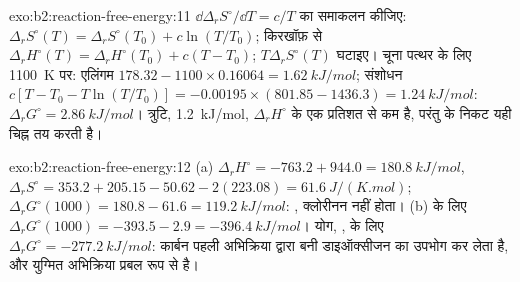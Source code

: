 \begin{solution}{exo:b2:reaction-free-energy:11}
$\dd\Delta_r S^\circ/\dd T = c/T$ का समाकलन कीजिए: $\Delta_r S^\circ(T) = \Delta_r
S^\circ(T_0) + c\ln(T/T_0)$; किरखॉफ़ से $\Delta_r H^\circ(T) = \Delta_r
H^\circ(T_0) + c(T - T_0)$; $T\Delta_r S^\circ(T)$ घटाइए। चूना पत्थर के लिए
\qty{1100}{K} पर: एलिंगम $178.32 - 1100 \times 0.16064 = \qty{1.62}{kJ/mol}$;
संशोधन $c[T - T_0 - T\ln(T/T_0)] = -0.00195 \times (801.85 - 1436.3) =
\qty{+1.24}{kJ/mol}$: $\Delta_r G^\circ = \qty{2.86}{kJ/mol}$। त्रुटि,
\qty{1.2}{kJ/mol}, $\Delta_r H^\circ$ के एक प्रतिशत से कम है, परंतु
 के निकट यही चिह्न तय करती है।
\end{solution}

\begin{solution}{exo:b2:reaction-free-energy:12}
(a) $\Delta_r H^\circ = -763.2 + 944.0 = \qty{+180.8}{kJ/mol}$, $\Delta_r
S^\circ = 353.2 + 205.15 - 50.62 - 2(223.08) = \qty{+61.6}{J/(K.mol)}$;
$\Delta_r G^\circ(1000) = 180.8 - 61.6 = \qty{+119.2}{kJ/mol}$: ,
क्लोरीनन नहीं होता। (b)  के लिए $\Delta_r G^\circ(1000) =
-393.5 - 2.9 = \qty{-396.4}{kJ/mol}$। योग, , के लिए $\Delta_r G^\circ = \qty{-277.2}{kJ/mol}$: कार्बन
पहली अभिक्रिया द्वारा बनी डाइऑक्सीजन का उपभोग कर लेता है, और युग्मित अभिक्रिया
प्रबल रूप से  है।
\end{solution}

